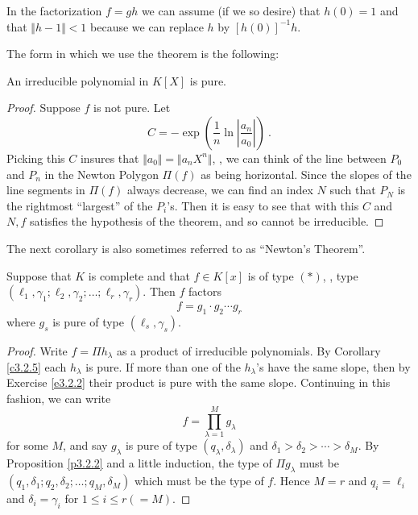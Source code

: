 \rem
In the factorization $f=gh$ we can assume (if we so desire) that $h(0)=1$ and that $\Vert h-1\Vert<1$ because we can replace $h$ by $[h(0)]^{-1}h$.

The form in which we use the theorem is the following:

\begin{coro}
\label{c3.2.5}
An irreducible polynomial in $K[X]$ is pure.
\end{coro}

\begin{proof}
Suppose $f$ is not pure. Let
$$
C=-\exp\left(\frac{1}{n}\ln\left|\frac{a_{n}}{a_{0}}\right|\right)\ .
$$
Picking this $C$ insures that $\Vert a_{0}\Vert=\Vert a_{n}X^{n}\Vert$, \ie, we can think of the line between $P_{0}$ and $P_{n}$ in the Newton Polygon $\Pi(f)$ as being horizontal. Since the slopes of the line segments in $\Pi(f)$ always decrease, we can find an index $N$ such that $P_{N}$ is the rightmost ``largest'' of the $P_{i}$'s. Then it is easy to see that with this $C$ and $N,f$ satisfies the hypothesis of the theorem, and so cannot be irreducible. 
\end{proof}

The next corollary is also sometimes referred to as ``Newton's Theorem''.

\begin{coro}
\label{c3.2.6}
Suppose that $K$ is complete and that $f\in K[x]$ is of type $(*)$, \ie, type $(\ell_{1},\gamma_{1};\ell_{2},\gamma_{2};\ldots;\ell_{r},\gamma_{r})$. Then $f$ factors
$$
f=g_{1}\cdot g_{2}\cdots g_{r}
$$
where $g_{s}$ is pure of type $(\ell_{s},\gamma_{s})$.
\end{coro}

\begin{proof}
Write $f=\Pi h_{\lambda}$ as a product of irreducible polynomials. By Corollary \ref{c3.2.5} each $h_{\lambda}$ is pure. If more than one of the $h_{\lambda}$'s have the same slope, then by Exercise \ref{e3.2.2} their product is pure with the same slope. Continuing in this fashion, we can write
$$
f=\prod_{\lambda=1}^{M}g_{\lambda}
$$
for some $M$, and say $g_{\lambda}$ is pure of type $(q_{\lambda},\delta_{\lambda})$ and $\delta_{1}>\delta_{2}>\cdots>\delta_{M}$. By Proposition \ref{p3.2.2} and a little induction, the type of $\Pi g_{\lambda}$ must be $(q_{1}, \delta_{1};q_{2},\delta_{2};\ldots ; q_{M},\delta_{M})$ which must be the type of $f$. Hence $M=r$ and $q_{i}=\ell_{i}$ and $\delta_{i}=\gamma_{i}$ for $1\leq i\leq r(=M)$.
\end{proof}

